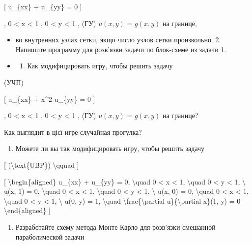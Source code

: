 \documentclass[
]{article}
\providecommand{\tightlist}{%
  \setlength{\itemsep}{0pt}\setlength{\parskip}{0pt}}
\begin{document}
{{[} u\_\{xx\} + u\_\{yy\} = 0 {]}

, 0 \textless{} x \textless{} 1 , 0 \textless{} y \textless{} 1 , (ГУ)
\(u(x, y)\) = \(g(x, y)\) на границе,

\begin{itemize}
\item
  во внутренних узлах сетки, якщо число узлов сетки произвольно. 2.
  Напишите программу для розв'язки задачи по блок-схеме из задачи 1.
\item
  \begin{enumerate}
  \def\labelenumi{\arabic{enumi}.}
  \setcounter{enumi}{2}
  \tightlist
  \item
    Как модифицировать игру, чтобы решить задачу
  \end{enumerate}
\end{itemize}

(УЧП)

{[} u\_\{xx\} + x\^{}2 u\_\{yy\} = 0 {]}

, 0 \textless{} x \textless{} 1 , 0 \textless{} y \textless{} 1 , (ГУ)
\(u(x, y)\) = \(g(x, y)\) на границе?

Как выглядит в цієї игре случайная прогулка?

\begin{enumerate}
\def\labelenumi{\arabic{enumi}.}
\setcounter{enumi}{3}
\tightlist
\item
  Можете ли вы так модифицировать игру, чтобы решить задачу
\end{enumerate}

{[} (\textbackslash text\{UBP\}) \textbackslash qquad {]}

{[} \textbackslash begin\{aligned\} u\_\{xx\} + u\_\{yy\} = 0,
\textbackslash quad 0 \textless{} x \textless{} 1, \textbackslash quad 0
\textless{} y \textless{} 1, \textbackslash{} u(x, 1) = 0,
\textbackslash quad 0 \textless{} x \textless{} 1, \textbackslash quad 0
\textless{} y \textless{} 1, \textbackslash{} u(x, 0) = 0,
\textbackslash quad 0 \textless{} x \textless{} 1, \textbackslash quad 0
\textless{} y \textless{} 1, \textbackslash{} u(0, y) = 1,
\textbackslash quad \textbackslash frac\{\textbackslash partial
u\}\{\textbackslash partial x\}(1, y) = 0 \textbackslash end\{aligned\}
{]}

\begin{enumerate}
\def\labelenumi{\arabic{enumi}.}
\setcounter{enumi}{4}
\item
  Разработайте схему метода Монте-Карло для розв'язки смешанной
  параболической задачи


\end{enumerate}}
\end{document}
